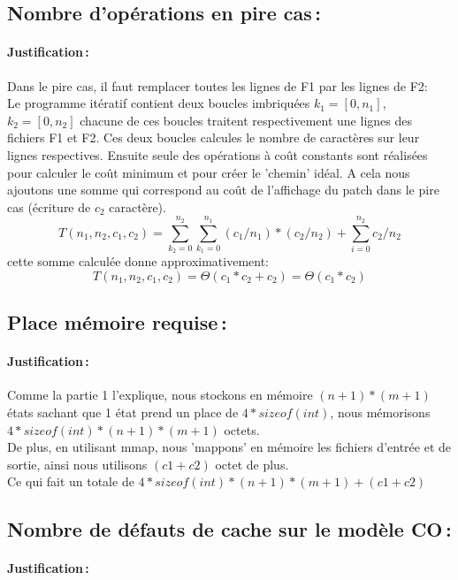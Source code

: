\documentclass[a4paper, 10pt, french]{article}
\begin{document}
  \subsection{Nombre  d'opérations en pire cas\,: }
    \paragraph{Justification\,: }
    {Dans le pire cas, il faut remplacer toutes les lignes de F1 par les lignes de F2: 
      \\Le programme itératif contient deux boucles imbriquées $k_1=[0,n_1]$, $k_2=[0,n_2]$ chacune de ces boucles traitent respectivement une lignes des fichiers F1 et F2. Ces deux boucles calcules le nombre de caractères sur leur lignes respectives. Ensuite seule des opérations à coût constants sont réalisées pour calculer le coût minimum et pour créer le 'chemin' idéal. A cela nous ajoutons une somme qui correspond au coût de l'affichage du patch dans le pire cas (écriture de $c_2$ caractère).
      $$T(n_1, n_2, c_1, c_2) = \sum_{k_2=0}^{n_2}  \sum_{k_1=0}^{n_1} (c_1/n_1)*(c_2/n_2) + \sum_{i=0}^{n_2} c_2/n_2 $$ 
      cette somme calculée donne approximativement: $$ T(n_1, n_2, c_1, c_2) = \Theta (c_1*c_2+c_2) = \Theta (c_1*c_2) $$ 
    } 
  \subsection{Place mémoire requise\,: }
    \paragraph{Justification\,: }
    {
    	Comme la partie 1 l'explique, nous stockons en mémoire $(n+1)*(m+1)$ états sachant que 1 état prend un place de $4*sizeof(int)$, nous mémorisons $4*sizeof(int)*(n+1)*(m+1)$ octets.
	\\De plus, en utilisant mmap, nous 'mappons' en mémoire les fichiers d'entrée et de sortie, ainsi nous utilisons $(c1+c2)$ octet de plus. \\Ce qui fait un totale de $4*sizeof(int)*(n+1)*(m+1) + (c1+c2)$
    }

  \subsection{Nombre de défauts de cache sur le modèle CO\,: }
    \paragraph{Justification\,: }
\end{document}

